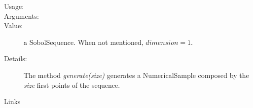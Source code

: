 \begin{description}

\item[Usage:] \rule{0pt}{1em}

\item[Arguments:]  \rule{0pt}{1em}

\item[Value:] a SobolSequence. When not mentioned, $dimension=1$.

\item[Details:]  The method \textit{generate(size)} generates a NumericalSample composed by the \textit{size} first points of the sequence.


\item[Links] \rule{0pt}{1em}
\end{description}
